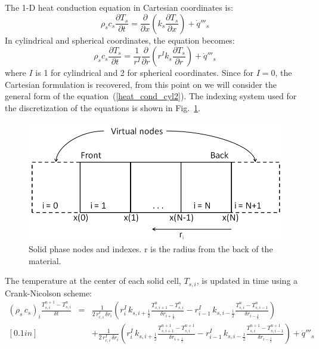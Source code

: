 The 1-D heat conduction equation in Cartesian coordinates is:
\begin{equation}
\label{heat_cond_cart}
     \rho_s c_s \frac{\partial T_s}{\partial t} = \frac{\partial}{\partial x} \left( k_s \frac{\partial T_s}{\partial x} \right) + \dot{q}'''_s
\end{equation}
In cylindrical and spherical coordinates, the equation becomes:
\begin{equation}
\label{heat_cond_cyl2}
     \rho_s c_s \frac{\partial T_s}{\partial t} = \frac{1}{r^I}\frac{\partial}{\partial r} \left( r^I k_s \frac{\partial T_s}{\partial r} \right) + \dot{q}'''_s
\end{equation}
where $I$ is 1 for cylindrical and 2 for spherical coordinates. Since for $I=0$, the Cartesian formulation is recovered, from this point on we will consider the general form of the equation~(\ref{heat_cond_cyl2}). The indexing system used for the discretization of the equations is shown in Fig.~\ref{fig_solid_nodes}.
\begin{figure}[t]
    \centering
    \includegraphics[width=5.0in]{FIGURES/appendix_I_solid_nodes}
    \caption{Solid phase nodes and indexes. r is the radius from the back of the material.}
    \label{fig_solid_nodes}
\end{figure}
The temperature at the center of each solid cell, $T_{s,i}$, is updated in time using a Crank-Nicolson scheme:
\begin{eqnarray}
\label{crank-nicolson}
(\rho_s \, c_s)_i \frac{T_{s,i}^{n+1}-T_{s,i}^{n}}{\delta t}
& = & \frac{1}{2 \, r_{c,i}^I \, \delta r_i} \left( r_{i}^{I} \, k_{s,i+\frac{1}{2}} \frac{T_{s,i+1}^{n}-T_{s,i}^{n}}{\delta r_{i+\frac{1}{2}}} - r_{i-1}^{I} \, k_{s,i-\frac{1}{2}} \frac{T_{s,i}^{n}-T_{s,i-1}^{n}}{\delta r_{i-\frac{1}{2}}} \right) \nonumber \\ [0.1in]
& & +\frac{1}{2 \, r_{c,i}^I \, \delta r_i} \left( r_{i}^{I} \, k_{s,i+\frac{1}{2}} \frac{T_{s,i+1}^{n+1}-T_{s,i}^{n+1}}{\delta r_{i+\frac{1}{2}}} - r_{i-1}^{I} \, k_{s,i-\frac{1}{2}} \frac{T_{s,i}^{n+1}-T_{s,i-1}^{n+1}}{\delta r_{i-\frac{1}{2}}} \right) + \dot{q}'''_s
\end{eqnarray}
